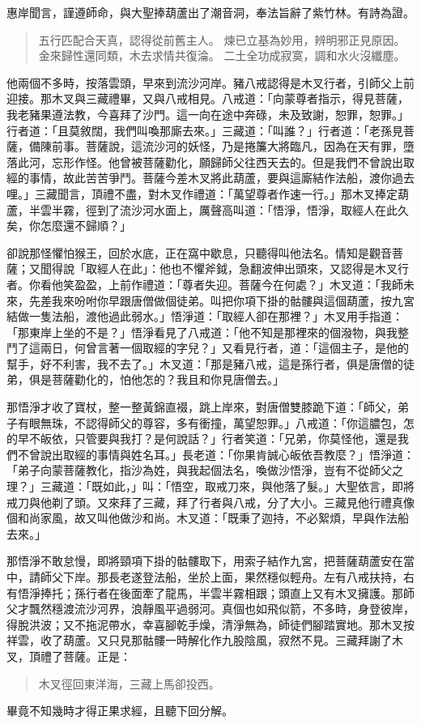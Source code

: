 惠岸聞言，謹遵師命，與大聖捧葫蘆出了潮音洞，奉法旨辭了紫竹林。有詩為證。
\begin{quote}
五行匹配合天真，認得從前舊主人。
煉已立基為妙用，辨明邪正見原因。
金來歸性還同類，木去求情共復淪。
二土全功成寂寞，調和水火沒纖塵。
\end{quote}

他兩個不多時，按落雲頭，早來到流沙河岸。豬八戒認得是木叉行者，引師父上前迎接。那木叉與三藏禮畢，又與八戒相見。八戒道：「向蒙尊者指示，得見菩薩，我老豬果遵法教，今喜拜了沙門。這一向在途中奔碌，未及致謝，恕罪，恕罪。」行者道：「且莫敘闊，我們叫喚那廝去來。」三藏道：「叫誰？」行者道：「老孫見菩薩，備陳前事。菩薩說，這流沙河的妖怪，乃是捲簾大將臨凡，因為在天有罪，墮落此河，忘形作怪。他曾被菩薩勸化，願歸師父往西天去的。但是我們不曾說出取經的事情，故此苦苦爭鬥。菩薩今差木叉將此葫蘆，要與這廝結作法船，渡你過去哩。」三藏聞言，頂禮不盡，對木叉作禮道：「萬望尊者作速一行。」那木叉捧定葫蘆，半雲半霧，徑到了流沙河水面上，厲聲高叫道：「悟淨，悟淨，取經人在此久矣，你怎麼還不歸順？」

卻說那怪懼怕猴王，回於水底，正在窩中歇息，只聽得叫他法名。情知是觀音菩薩；又聞得說「取經人在此」：他也不懼斧鉞，急翻波伸出頭來，又認得是木叉行者。你看他笑盈盈，上前作禮道：「尊者失迎。菩薩今在何處？」木叉道：「我師未來，先差我來吩咐你早跟唐僧做個徒弟。叫把你項下掛的骷髏與這個葫蘆，按九宮結做一隻法船，渡他過此弱水。」悟淨道：「取經人卻在那裡？」木叉用手指道：「那東岸上坐的不是？」悟淨看見了八戒道：「他不知是那裡來的個潑物，與我整鬥了這兩日，何曾言著一個取經的字兒？」又看見行者，道：「這個主子，是他的幫手，好不利害，我不去了。」木叉道：「那是豬八戒，這是孫行者，俱是唐僧的徒弟，俱是菩薩勸化的，怕他怎的？我且和你見唐僧去。」

那悟淨才收了寶杖，整一整黃錦直裰，跳上岸來，對唐僧雙膝跪下道：「師父，弟子有眼無珠，不認得師父的尊容，多有衝撞，萬望恕罪。」八戒道：「你這膿包，怎的早不皈依，只管要與我打？是何說話？」行者笑道：「兄弟，你莫怪他，還是我們不曾說出取經的事情與姓名耳。」長老道：「你果肯誠心皈依吾教麼？」悟淨道：「弟子向蒙菩薩教化，指沙為姓，與我起個法名，喚做沙悟淨，豈有不從師父之理？」三藏道：「既如此，」叫：「悟空，取戒刀來，與他落了髮。」大聖依言，即將戒刀與他剃了頭。又來拜了三藏，拜了行者與八戒，分了大小。三藏見他行禮真像個和尚家風，故又叫他做沙和尚。木叉道：「既秉了迦持，不必絮煩，早與作法船去來。」

那悟淨不敢怠慢，即將頸項下掛的骷髏取下，用索子結作九宮，把菩薩葫蘆安在當中，請師父下岸。那長老遂登法船，坐於上面，果然穩似輕舟。左有八戒扶持，右有悟淨捧托；孫行者在後面牽了龍馬，半雲半霧相跟；頭直上又有木叉擁護。那師父才飄然穩渡流沙河界，浪靜風平過弱河。真個也如飛似箭，不多時，身登彼岸，得脫洪波；又不拖泥帶水，幸喜腳乾手燥，清淨無為，師徒們腳踏實地。那木叉按祥雲，收了葫蘆。又只見那骷髏一時解化作九股陰風，寂然不見。三藏拜謝了木叉，頂禮了菩薩。正是：
\begin{quote}
木叉徑回東洋海，三藏上馬卻投西。
\end{quote}

畢竟不知幾時才得正果求經，且聽下回分解。
